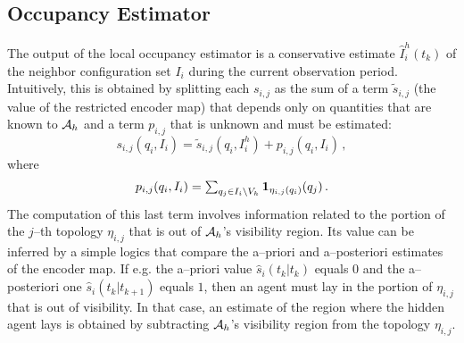 \documentclass[journal, onecolumn, 12pt]{styles/IEEEtran}
\begin{document}
\subsection{Occupancy Estimator}

The output of the local occupancy estimator is a conservative estimate $\hat{I}_i^h(t_k)$ of the neighbor configuration set $I_i$ during the current observation period. Intuitively, this is obtained by splitting each $s_{i,j}$ as the sum of a term $\tilde{s}_{i,j}$ (the value of the restricted encoder map) that depends only on quantities that are known to $\mathcal{A}_h$ and a term $p_{i,j}$ that is unknown and must be estimated:
$$
s_{i,j}(q_i, I_i) = \tilde{s}_{i,j}(q_i, I_i^h)  + p_{i,j}(q_i, I_i) \, , 
$$
where
$$
\begin{array}{c}
p_{i,j} (q_i, I_i) = \sum_{q_j \in I_i \setminus V_h} {\bf 1}_{\eta_{i,j}(q_i)}(q_j) \, .
\end{array}
$$
The computation of this last term involves information related to the portion of the $j$--th topology $\eta_{i,j}$ that is out of $\mathcal{A}_h$'s visibility region. Its value can be inferred by a simple logics that compare the a--priori and a--posteriori estimates of the encoder map. If e.g. the a--priori value $\hat{s}_i(t_k|t_k)$ equals $0$ and the a--posteriori one $\hat{s}_i(t_k|t_{k+1})$ equals $1$, then an agent must lay in the portion of $\eta_{i,j}$ that is out of visibility. In that case, an estimate of the region where the hidden agent lays is obtained by subtracting $\mathcal{A}_h$'s visibility region from the topology $\eta_{i,j}$.
\end{document}
